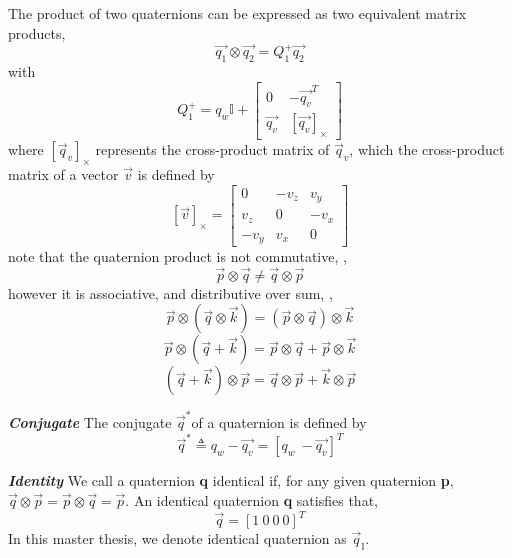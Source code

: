 The product of two quaternions can be expressed as two equivalent matrix products,
\begin{equation}\label{q4}
	\vec{q_1} \otimes \vec{q_2} = Q_1^+\vec{q_2}
\end{equation}
with
\begin{equation}\label{q5}
	Q_1^+ = q_w\mathbb{I} + \begin{bmatrix}
							  	0 &
							  	-\vec{q_v}^T\\
							  	\vec{q_v} &
							  	[\vec{q_v}]_\times
							  \end{bmatrix}
\end{equation}
where $[\vec{q}_v]_\times$ represents the cross-product matrix of $\vec{q}_v$, which the cross-product matrix of a vector $\vec{v}$ is defined by
\begin{equation} \label{q17}
	[\vec{v}]_\times =  \begin{bmatrix}
							0 & -v_z & v_y \\
							v_z & 0 & -v_x \\
							-v_y & v_x & 0 
						\end{bmatrix}
\end{equation}
note that the quaternion product is not commutative, \ie, 
\begin{equation}
	\vec{p} \otimes \vec{q} \neq \vec{q} \otimes \vec{p}
\end{equation}
however it is associative, and distributive over sum, \ie,
\begin{equation} \label{q26}
	\vec{p} \otimes (\vec{q} \otimes \vec{k}) = (\vec{p} \otimes \vec{q}) \otimes \vec{k}
\end{equation}
\begin{equation} \label{q27}
	\vec{p} \otimes (\vec{q} + \vec{k}) = \vec{p} \otimes \vec{q} + \vec{p} \otimes \vec{k}
\end{equation}
\begin{equation} \label{q28}
	(\vec{q} + \vec{k}) \otimes \vec{p} = \vec{q} \otimes \vec{p} + \vec{k} \otimes \vec{p}
\end{equation}

\textbf{\textit{Conjugate}} The conjugate $\vec{q}^*$of a quaternion is defined by
\begin{equation}\label{q6}
	\vec{q}^* \triangleq q_w - \vec{q_v} = \left[ q_w \ - \vec{q_v} \right]^T
\end{equation}

\textbf{\textit{Identity}} We call a quaternion \textbf{q} identical if, for any given quaternion \textbf{p}, $\vec{q} \otimes \vec{p} = \vec{p} \otimes \vec{q} = \vec{p}$. An identical quaternion \textbf{q} satisfies that,
\begin{equation}\label{q8}
	\vec{q} = \left[1 \ 0 \ 0 \ 0 \right]^T
\end{equation}
In this master thesis, we denote identical quaternion as $\vec{q}_{\mathbb{I}}$.

